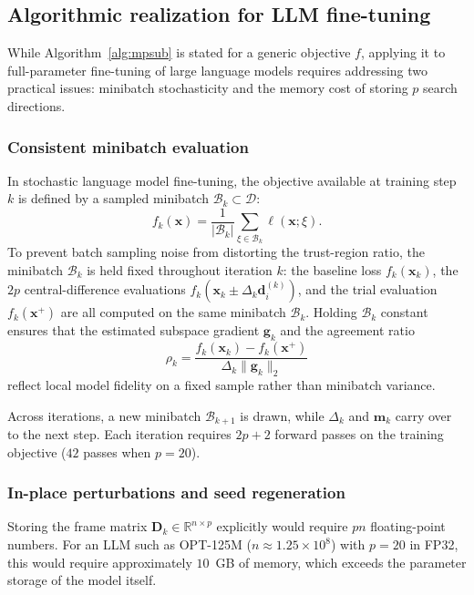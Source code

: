 \documentclass{siamart171218}
\newcommand{\bx}{\bm{x}}
\newcommand{\bd}{\bm{d}}
\newcommand{\bg}{\bm{g}}
\begin{document}
\subsection{Algorithmic realization for LLM fine-tuning}
\label{subsec:llm_realization}

While Algorithm~\ref{alg:mpsub} is stated for a generic objective $f$, applying it to full-parameter fine-tuning of large language models requires addressing two practical issues: minibatch stochasticity and the memory cost of storing $p$ search directions.

\subsubsection{Consistent minibatch evaluation}
In stochastic language model fine-tuning, the objective available at training step $k$ is defined by a sampled minibatch $\mathcal B_k \subset \mathcal D$:
\begin{equation}
f_k(\bx) = \frac{1}{|\mathcal B_k|} \sum_{\xi \in \mathcal B_k} \ell(\bx; \xi).
\label{eq:minibatch_loss}
\end{equation}
To prevent batch sampling noise from distorting the trust-region ratio, the minibatch $\mathcal B_k$ is held fixed throughout iteration $k$: the baseline loss $f_k(\bx_k)$, the $2p$ central-difference evaluations $f_k(\bx_k \pm \Delta_k \bd_i^{(k)})$, and the trial evaluation $f_k(\bx^+)$ are all computed on the same minibatch $\mathcal B_k$. Holding $\mathcal B_k$ constant ensures that the estimated subspace gradient $\bg_k$ and the agreement ratio
\begin{equation}
\rho_k = \frac{f_k(\bx_k) - f_k(\bx^+)}{\Delta_k \|\bg_k\|_2}
\label{eq:minibatch_rho}
\end{equation}
reflect local model fidelity on a fixed sample rather than minibatch variance.

Across iterations, a new minibatch $\mathcal B_{k+1}$ is drawn, while $\Delta_k$ and $\bm m_k$ carry over to the next step. Each iteration requires $2p + 2$ forward passes on the training objective ($42$ passes when $p = 20$).

\subsubsection{In-place perturbations and seed regeneration}
Storing the frame matrix $\bm D_k \in \mathbb{R}^{n \times p}$ explicitly would require $pn$ floating-point numbers. For an LLM such as OPT-125M ($n \approx 1.25 \times 10^8$) with $p = 20$ in FP32, this would require approximately $10$~GB of memory, which exceeds the parameter storage of the model itself.
\end{document}
